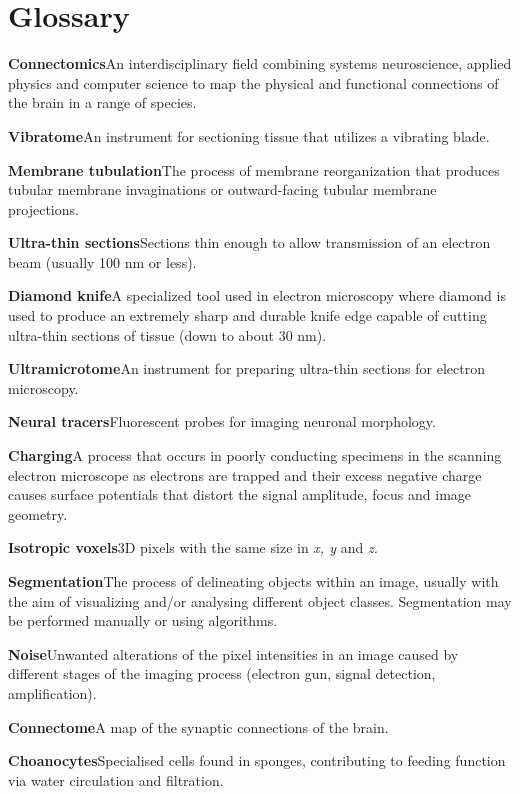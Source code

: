 \documentclass{article}
\begin{document}
\section*{Glossary}
\begin{hangpars}
\textbf{Connectomics}\quad An interdisciplinary field combining systems neuroscience, applied physics and computer science to map the physical and functional connections of the brain in a range of species.

\textbf{Vibratome}\quad An instrument for sectioning tissue that utilizes a vibrating blade.

\textbf{Membrane tubulation}\quad The process of membrane reorganization that produces tubular membrane invaginations or outward-facing tubular membrane projections.

\textbf{Ultra-thin sections}\quad Sections thin enough to allow transmission of an electron beam (usually 100 nm or less).

\textbf{Diamond knife}\quad A specialized tool used in electron microscopy where diamond is used to produce an extremely sharp and durable knife edge capable of cutting ultra-thin sections of tissue (down to about 30 nm).


\textbf{Ultramicrotome}\quad An instrument for preparing ultra-thin sections for electron microscopy.

\textbf{Neural tracers}\quad Fluorescent probes for imaging neuronal morphology.

\textbf{Charging}\quad A process that occurs in poorly conducting specimens in the scanning electron microscope as electrons are trapped and their excess negative charge causes surface potentials that distort the signal amplitude, focus and image geometry.

\textbf{Isotropic voxels}\quad 3D pixels with the same size in \emph{x, y} and \emph{z.}

\textbf{Segmentation}\quad The process of delineating objects within an image, usually with the aim of visualizing and/or analysing different object classes. Segmentation may be performed manually or using algorithms.

\textbf{Noise}\quad Unwanted alterations of the pixel intensities in an image caused by different stages of the imaging process (electron gun, signal detection, amplification).

\textbf{Connectome}\quad A map of the synaptic connections of the brain.

\textbf{Choanocytes}\quad Specialised cells found in sponges, contributing to feeding function via water circulation and filtration.


\end{hangpars}
\end{document}
